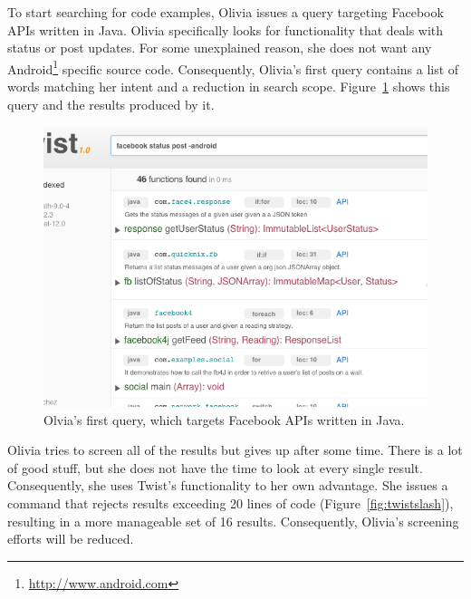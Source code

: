 To start searching for code examples, Olivia issues a query targeting Facebook APIs written in Java. Olivia specifically looks for functionality that deals with status or post updates. For some unexplained reason, she does not want any Android\footnote{\url{http://www.android.com}} specific source code. Consequently, Olivia's first query contains a list of words matching her intent and a reduction in search scope. Figure~\ref{fig:twistquery} shows this query and the results produced by it. 

\begin{figure}[!ht]
    \centering
    \includegraphics[width=\textwidth]{images/twistquery}
    \caption{Olvia's first query, which targets Facebook APIs written in Java.}
    \label{fig:twistquery}
\end{figure}

Olivia tries to screen all of the results but gives up after some time. There is a lot of good stuff, but she does not have the time to look at every single result. Consequently, she uses Twist's functionality to her own advantage. She issues a command that rejects results exceeding 20 lines of code (Figure~\ref{fig:twistslash}), resulting in a more manageable set of 16 results. Consequently, Olivia's screening efforts will be reduced.

